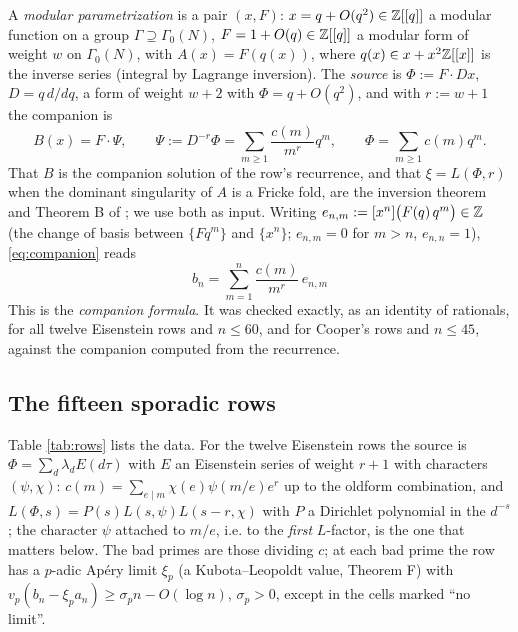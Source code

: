 \documentclass[11pt]{amsart}
\theoremstyle{definition}
\theoremstyle{remark}
\begin{document}
A \emph{modular parametrization} is a pair $(x,F)$: $x=q+O(q^2)\in\mathbb Z[[q]]$ a modular function on a group $\Gamma\supseteq\Gamma_0(N)$, $F=1+O(q)\in\mathbb Z[[q]]$ a modular form of weight $w$ on $\Gamma_0(N)$, with $A(x)=F(q(x))$, where $q(x)\in x+x^2\mathbb Z[[x]]$ is the inverse series (integral by Lagrange inversion). The \emph{source} is $\Phi:=F\cdot Dx$, $D=q\,d/dq$, a form of weight $w+2$ with $\Phi=q+O(q^2)$, and with $r:=w+1$ the companion is
\begin{equation}\label{eq:companion}
B(x)=F\cdot\Psi,\qquad \Psi:=D^{-r}\Phi=\sum_{m\ge1}\frac{c(m)}{m^r}q^m,\qquad \Phi=\sum_{m\ge1}c(m)q^m .
\end{equation}
That $B$ is the companion solution of the row's recurrence, and that $\xi=L(\Phi,r)$ when the dominant singularity of $A$ is a Fricke fold, are the inversion theorem and Theorem B of \cite{ProjSources}; we use both as input. Writing $e_{n,m}:=[x^n]\bigl(F(q)\,q^m\bigr)\in\mathbb Z$ (the change of basis between $\{Fq^m\}$ and $\{x^n\}$; $e_{n,m}=0$ for $m>n$, $e_{n,n}=1$), \eqref{eq:companion} reads
\begin{equation}\label{eq:formula}
\boxed{\ b_n=\sum_{m=1}^{n}\frac{c(m)}{m^r}\,e_{n,m}\ }
\end{equation}
This is the \emph{companion formula}. It was checked exactly, as an identity of rationals, for all twelve Eisenstein rows and $n\le60$, and for Cooper's rows and $n\le45$, against the companion computed from the recurrence.

\subsection{The fifteen sporadic rows}
Table \ref{tab:rows} lists the data. For the twelve Eisenstein rows the source is $\Phi=\sum_d\lambda_dE(d\tau)$ with $E$ an Eisenstein series of weight $r+1$ with characters $(\psi,\chi)$: $c(m)=\sum_{e\mid m}\chi(e)\psi(m/e)e^{r}$ up to the oldform combination, and $L(\Phi,s)=P(s)L(s,\psi)L(s-r,\chi)$ with $P$ a Dirichlet polynomial in the $d^{-s}$; the character $\psi$ attached to $m/e$, i.e. to the \emph{first} $L$-factor, is the one that matters below. The bad primes are those dividing $c$; at each bad prime the row has a $p$-adic Ap\'ery limit $\xi_p$ (a Kubota--Leopoldt value, \cite{ProjSources} Theorem F) with $v_p(b_n-\xi_pa_n)\ge\sigma_pn-O(\log n)$, $\sigma_p>0$, except in the cells marked ``no limit''.
\end{document}
